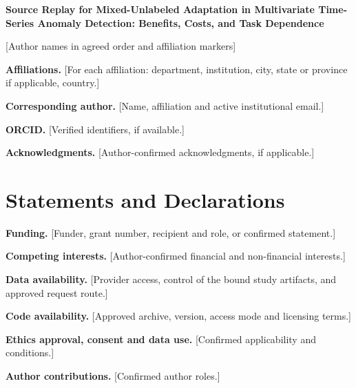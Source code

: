 \documentclass[11pt]{article}
\begin{document}
\begin{center}
{\LARGE\bfseries Source Replay for Mixed-Unlabeled Adaptation in
Multivariate Time-Series Anomaly Detection: Benefits, Costs, and Task Dependence\par}
\vspace{1.5em}
{[Author names in agreed order and affiliation markers]\par}
\end{center}
\noindent\textbf{Affiliations.} [For each affiliation: department, institution, city, state or province if applicable, country.]\par
\noindent\textbf{Corresponding author.} [Name, affiliation and active institutional email.]\par
\noindent\textbf{ORCID.} [Verified identifiers, if available.]\par
\noindent\textbf{Acknowledgments.} [Author-confirmed acknowledgments, if applicable.]\par
\section*{Statements and Declarations}
\noindent\textbf{Funding.} [Funder, grant number, recipient and role, or confirmed statement.]\par
\noindent\textbf{Competing interests.} [Author-confirmed financial and non-financial interests.]\par
\noindent\textbf{Data availability.} [Provider access, control of the bound study artifacts, and approved request route.]\par
\noindent\textbf{Code availability.} [Approved archive, version, access mode and licensing terms.]\par
\noindent\textbf{Ethics approval, consent and data use.} [Confirmed applicability and conditions.]\par
\noindent\textbf{Author contributions.} [Confirmed author roles.]\par
\end{document}
